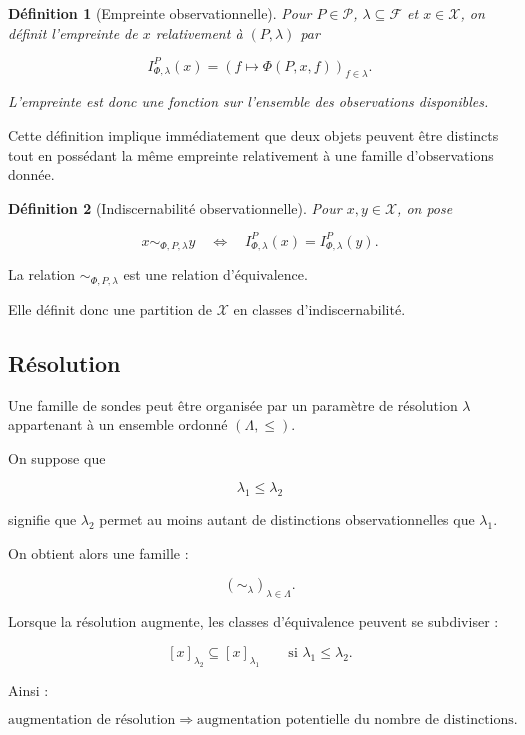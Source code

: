 \documentclass[11pt,a4paper]{article}
\newtheorem{definition}{Définition}[section]
\newcommand{\X}{\mathcal X}
\newcommand{\F}{\mathcal F}
\begin{document}
\begin{definition}[Empreinte observationnelle]
Pour $P\in\mathcal P$, $\lambda\subseteq\F$ et $x\in\X$, on définit
l'empreinte de $x$ relativement à $(P,\lambda)$ par

\[
I_{\Phi,\lambda}^{P}(x)
=
\left(
f\mapsto \Phi(P,x,f)
\right)_{f\in\lambda}.
\]

L'empreinte est donc une fonction sur l'ensemble des observations disponibles.
\end{definition}

Cette définition implique immédiatement que deux objets peuvent être
distincts tout en possédant la même empreinte relativement à une famille
d'observations donnée.

\begin{definition}[Indiscernabilité observationnelle]
Pour $x,y\in\X$, on pose

\[
x\sim_{\Phi,P,\lambda}y
\quad\Longleftrightarrow\quad
I_{\Phi,\lambda}^{P}(x)
=
I_{\Phi,\lambda}^{P}(y).
\]

\end{definition}

La relation $\sim_{\Phi,P,\lambda}$ est une relation d'équivalence.

Elle définit donc une partition de $\X$ en classes d'indiscernabilité.

\subsection{Résolution}

Une famille de sondes peut être organisée par un paramètre de résolution
$\lambda$ appartenant à un ensemble ordonné $(\Lambda,\leq)$.

On suppose que

\[
\lambda_1\leq\lambda_2
\]

signifie que $\lambda_2$ permet au moins autant de distinctions
observationnelles que $\lambda_1$.

On obtient alors une famille :

\[
\left(
\sim_{\lambda}
\right)_{\lambda\in\Lambda}.
\]

Lorsque la résolution augmente, les classes d'équivalence peuvent se
subdiviser :

\[
[x]_{\lambda_2}
\subseteq
[x]_{\lambda_1}
\qquad
\text{si }
\lambda_1\leq\lambda_2.
\]

Ainsi :

\[
\boxed{
\text{augmentation de résolution}
\Longrightarrow
\text{augmentation potentielle du nombre de distinctions}.
}
\]
\end{document}
